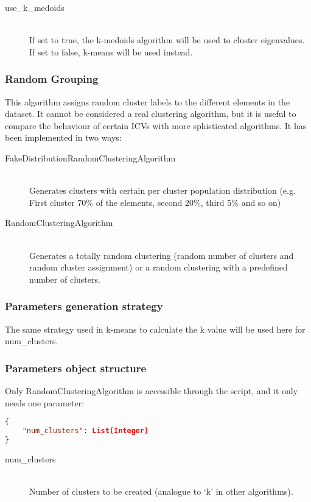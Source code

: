 \begin{description}
\item [use\_k\_medoids] \hfill \\If set to true, the k-medoids algorithm will
be used to cluster eigenvalues. If set to false, k-means will be used
instead.
\end{description}

\subsubsection{Random Grouping}

This algorithm assigns random cluster labels to the different elements
in the dataset. It cannot be considered a real clustering algorithm,
but it is useful to compare the behaviour of certain ICVs with more
sphisticated algorithms. It has been implemented in two ways: 

\begin{description}
\item [FakeDistributionRandomClusteringAlgorithm] \hfill \\Generates clusters
with certain per cluster population distribution (e.g. First cluster
70\% of the elements, second 20\%, third 5\% and so on) 
\item [RandomClusteringAlgorithm] \hfill \\Generates a totally random clustering
(random number of clusters and random cluster assignment) or a random
clustering with a predefined number of clusters.
\end{description}

\subsubsection{Parameters generation strategy}

The same strategy used in k-means to calculate the k value will be used 
here for num\_clusters.

\subsubsection{Parameters object structure}

Only RandomClusteringAlgorithm is accessible through the script, and
it only needs one parameter: 

\begin{lstlisting}[language=json,firstnumber=1] 
{ 
	"num_clusters": List(Integer)
} 
\end{lstlisting}

\begin{description}
\item [num\_clusters] \hfill \\Number of clusters to be created (analogue
to `k' in other algorithms).
\end{description}


